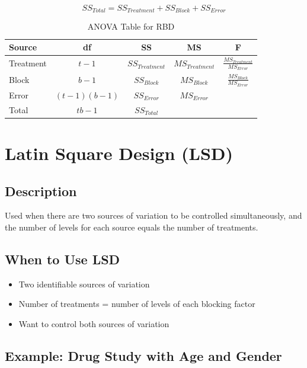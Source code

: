 \documentclass[twoside]{book}
\begin{document}
\begin{equation}
SS_{Total} = SS_{Treatment} + SS_{Block} + SS_{Error}
\end{equation}

\begin{table}[h]
\centering
\caption{ANOVA Table for RBD}
\begin{tabular}{|l|c|c|c|c|}
\hline
\textbf{Source} & \textbf{df} & \textbf{SS} & \textbf{MS} & \textbf{F} \\
\hline
Treatment & $t-1$ & $SS_{Treatment}$ & $MS_{Treatment}$ & $\frac{MS_{Treatment}}{MS_{Error}}$ \\
Block & $b-1$ & $SS_{Block}$ & $MS_{Block}$ & $\frac{MS_{Block}}{MS_{Error}}$ \\
Error & $(t-1)(b-1)$ & $SS_{Error}$ & $MS_{Error}$ & \\
\hline
Total & $tb-1$ & $SS_{Total}$ & & \\
\hline
\end{tabular}
\end{table}

\section{Latin Square Design (LSD)}

\subsection{Description}

Used when there are two sources of variation to be controlled simultaneously, and the number of levels for each source equals the number of treatments.

\subsection{When to Use LSD}

\begin{itemize}
    \item Two identifiable sources of variation
    \item Number of treatments = number of levels of each blocking factor
    \item Want to control both sources of variation
\end{itemize}

\subsection{Example: Drug Study with Age and Gender}
\end{document}
